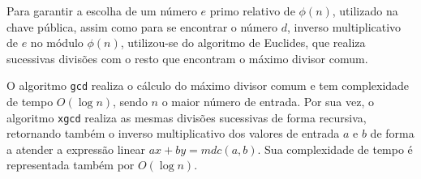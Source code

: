 Para garantir a escolha de um número $e$ primo relativo de $\phi(n)$, utilizado na chave pública, assim como para se encontrar o número $d$, inverso multiplicativo de $e$ no módulo $\phi(n)$, utilizou-se do algoritmo de Euclides, que realiza sucessivas divisões com o resto que encontram o máximo divisor comum.

O algoritmo \texttt{gcd} realiza o cálculo do máximo divisor comum e tem complexidade de tempo $O(\log{}n)$, sendo $n$ o maior número de entrada. Por sua vez, o algoritmo \texttt{xgcd} realiza as mesmas divisões sucessivas de forma recursiva, retornando também o inverso multiplicativo dos valores de entrada $a$ e $b$ de forma a atender a expressão linear $ax+by=mdc(a,b)$. Sua complexidade de tempo é representada também por $O(\log{}n)$.